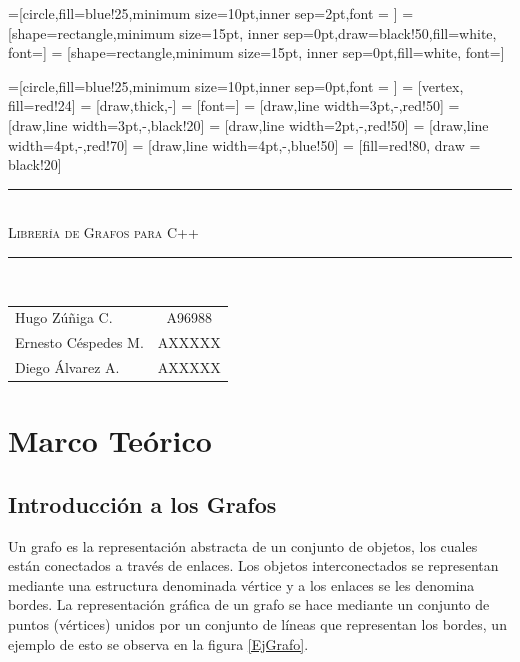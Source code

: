 \documentclass[a4paper, 11pt]{report}
\newcommand{\HRule}[1]{\rule{\linewidth}{#1}}
\begin{document}
=[circle,fill=blue!25,minimum size=10pt,inner sep=2pt,font = \small]
 = [shape=rectangle,minimum size=15pt, inner sep=0pt,draw=black!50,fill=white, font=\scriptsize]
 = [shape=rectangle,minimum size=15pt, inner sep=0pt,fill=white, font=\footnotesize]

=[circle,fill=blue!25,minimum size=10pt,inner sep=0pt,font = \tiny]
 = [vertex, fill=red!24]
 = [draw,thick,-]
 = [font=\scriptsize]
 = [draw,line width=3pt,-,red!50]
 = [draw,line width=3pt,-,black!20]
 = [draw,line width=2pt,-,red!50]
 = [draw,line width=4pt,-,red!70]
 = [draw,line width=4pt,-,blue!50]
 = [fill=red!80, draw = black!20]

\begin{titlepage}
    \begin{center}
        \HRule{0.5mm}\\[0.12cm]
        \textsc{\huge Librer\'ia de Grafos para C++}\\[0.2cm]
        \HRule{0.8mm}\\[1.7cm]
        \begin{flushright}
        \begin{tabular}{l c}
            Hugo Z\'u\~niga C. & A96988 \\
            Ernesto C\'espedes M. & AXXXXX \\
            Diego \'Alvarez A. & AXXXXX \\
        \end{tabular}
        \end{flushright}

    \end{center}
\end{titlepage}

\chapter{Marco Te\'orico}
\section{Introducci\'on a los Grafos}
Un grafo es la representaci\'on abstracta de un conjunto de objetos, los cuales est\'an conectados a trav\'es de enlaces. Los objetos interconectados se representan mediante una estructura denominada v\'ertice y a los enlaces se les denomina bordes. La representaci\'on  gr\'afica de un grafo se hace mediante un conjunto de puntos (v\'ertices) unidos por un conjunto de l\'ineas que representan los bordes, un ejemplo de esto se observa en la figura \ref{EjGrafo}.
\end{document}

